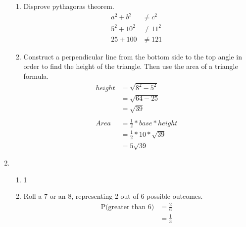 \documentclass[11pt]{article}
\begin{document}
\begin{enumerate}
\begin{enumerate}
            \item Disprove pythagoras theorem.
            \begin{equation*}
                \begin{split}
                    a^2+b^2&\neq c^2\\
                    5^2+10^2&\neq11^2\\
                    25+100&\neq121
                \end{split}
            \end{equation*}

            \item Construct a perpendicular line from the bottom side to the top angle in order to find the height of the triangle. Then use the area of a triangle formula.
            \begin{equation*}
                \begin{split}
                    height&=\sqrt{8^2-5^2}\\
                    &=\sqrt{64-25}\\
                    &=\sqrt{39}\\
                    \\            
                    Area&=\frac{1}{2}*base*height\\
                    &=\frac{1}{2}*10*\sqrt{39}\\
                    &=5\sqrt{39}
                \end{split}
            \end{equation*}
        \end{enumerate}

    \pagebreak
    \item
        \begin{enumerate}
            \item 1
            
            \item Roll a 7 or an 8, representing 2 out of 6 possible outcomes.
            \begin{equation*}
                \begin{split}
                    \text{P(greater than 6)}&=\frac{2}{6}\\
                    &=\frac{1}{3}
                \end{split}
            \end{equation*}


\end{enumerate}
\end{enumerate}
\end{document}
